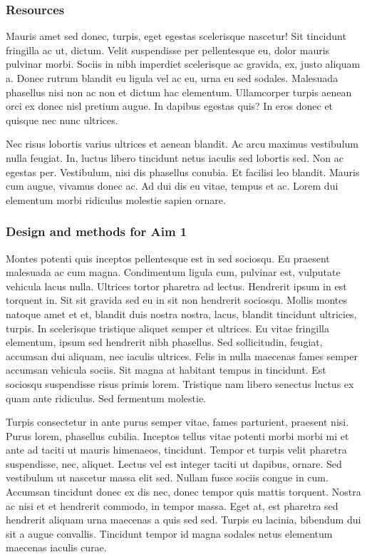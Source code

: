 \documentclass[11pt,]{article}
\begin{document}
\hypertarget{resources}{%
\subsubsection{Resources}\label{resources}}

Mauris amet sed donec, turpis, eget egestas scelerisque nascetur! Sit
tincidunt fringilla ac ut, dictum. Velit suspendisse per pellentesque
eu, dolor mauris pulvinar morbi. Sociis in nibh imperdiet scelerisque ac
gravida, ex, justo aliquam a. Donec rutrum blandit eu ligula vel ac eu,
urna eu sed sodales. Malesuada phasellus nisi non ac non et dictum hac
elementum. Ullamcorper turpis aenean orci ex donec nisl pretium augue.
In dapibus egestas quis? In eros donec et quisque nec nunc ultrices.

Nec risus lobortis varius ultrices et aenean blandit. Ac arcu maximus
vestibulum nulla feugiat. In, luctus libero tincidunt netus iaculis sed
lobortis sed. Non ac egestas per. Vestibulum, nisi dis phasellus
conubia. Et facilisi leo blandit. Mauris cum augue, vivamus donec ac. Ad
dui dis eu vitae, tempus et ac. Lorem dui elementum morbi ridiculus
molestie sapien ornare.

\hypertarget{design-and-methods-for-aim-1}{%
\subsubsection{Design and methods for Aim
1}\label{design-and-methods-for-aim-1}}

Montes potenti quis inceptos pellentesque est in sed sociosqu. Eu
praesent malesuada ac cum magna. Condimentum ligula cum, pulvinar est,
vulputate vehicula lacus nulla. Ultrices tortor pharetra ad lectus.
Hendrerit ipsum in est torquent in. Sit sit gravida sed eu in sit non
hendrerit sociosqu. Mollis montes natoque amet et et, blandit duis
nostra nostra, lacus, blandit tincidunt ultricies, turpis. In
scelerisque tristique aliquet semper et ultrices. Eu vitae fringilla
elementum, ipsum sed hendrerit nibh phasellus. Sed sollicitudin,
feugiat, accumsan dui aliquam, nec iaculis ultrices. Felis in nulla
maecenas fames semper accumsan vehicula sociis. Sit magna at habitant
tempus in tincidunt. Est sociosqu suspendisse risus primis lorem.
Tristique nam libero senectus luctus ex quam ante ridiculus. Sed
fermentum molestie.

Turpis consectetur in ante purus semper vitae, fames parturient,
praesent nisi. Purus lorem, phasellus cubilia. Inceptos tellus vitae
potenti morbi morbi mi et ante ad taciti ut mauris himenaeos, tincidunt.
Tempor et turpis velit pharetra suspendisse, nec, aliquet. Lectus vel
est integer taciti ut dapibus, ornare. Sed vestibulum ut nascetur massa
elit sed. Nullam fusce sociis congue in cum. Accumsan tincidunt donec ex
dis nec, donec tempor quis mattis torquent. Nostra ac nisi et et
hendrerit commodo, in tempor massa. Eget at, est pharetra sed hendrerit
aliquam urna maecenas a quis sed sed. Turpis eu lacinia, bibendum dui
sit a augue convallis. Tincidunt tempor id magna sodales netus elementum
maecenas iaculis curae.
\end{document}

